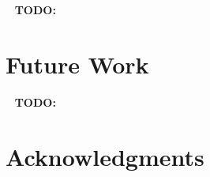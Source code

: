 \documentclass[11pt,a4paper]{article}
\begin{document}
\ \newline
\textbf{TODO:}
\ \newline

\section{Future Work}\label{future}



\ \newline
\textbf{TODO:}
\ \newline




\section*{Acknowledgments}

\ \newline
\newpage


\end{document}
